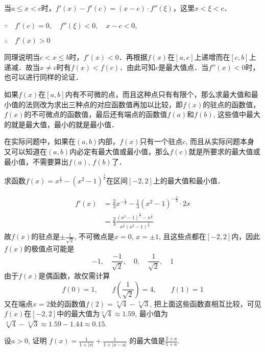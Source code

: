 当$a\le x<c$时，$f'(x)-f'(c)=(x-c)\cdot f''(\xi)$，这里$x<\xi<c$．

$\because\quad f' (c) =0,\quad f'' (\xi)<0,\quad x-c<0$,

$\therefore\quad f'(x)>0$

同理说明当$c<x\le b$时，$f'(x)<0$．再根据$f(x)$在$[a,c]$上递增而在$[c,b]$上递减．故当$x\ne c$时有$f(x)<f(c)$．由此可知$c$是最大值点．当$f''(x)<0$时，也可以进行同样的论证．

如果$f(x)$在$[a,b]$内有不可微的点，而且这种点只有有限个，那么求最大值和最小值的法则改为求出三种点的对应函数值再加以比较，即$f(x)$的驻点的函数值，$f(x)$的不可微点的函数值，最后还有端点的函数值$f(a)$和$f(b)$, 这些值中最大的就是最大值，最小的就是最小值．

在实际问题中，如果在$(a,b)$内部，$f(x)$只有一个驻点$c$, 而且从实际问题本身又可以知道在$(a,b)$内必定有最大值或最小值，那么$f(c)$就是所要求的最大值或最小值，不需要算出$f(a)$, $f(b)$了．

\begin{example}
求函数$f(x)=x^{\tfrac{2}{3}}-(x^2-1)^{\tfrac{1}{3}}$在区间$[-2,2]$上的最大值和最小值．
\end{example}


\begin{solution}
\begin{align*}
f'(x)&=\frac{2}{3}x^{-\tfrac{1}{3}}-\frac{1}{3}(x^2-1)^{-\tfrac{2}{3}}\cdot 2x\\
&=\frac{2}{3} \frac{(x^2-1)^{\tfrac{2}{3}}-x^{\tfrac{4}{3}}}{x^{\tfrac{1}{3}}(x^2-1)^{\tfrac{2}{3}}}    
\end{align*}
    故$f(x)$的驻点是$\pm\frac{1}{\sqrt{2}}$, 不可微点是$x=0$, $x=\pm 1$, 且这些点都在$[-2, 2]$内，因此$f(x)$的极值点可能是
\[-1,\quad \frac{-1}{\sqrt{2}},\quad  0,\quad \frac{1}{\sqrt{2}},\quad  1\]
    由于$f(x)$是偶函数，故仅需计算
\[    f (0) =1,\qquad f\left(\frac{1}{\sqrt{2}}\right) =4,\qquad f (1) =1\]
    又在端点$x=2$处的函数值$f(2)=\sqrt[3]{4}-\sqrt[3]{3}$, 把上面这些函数直相互比较，可见$f(x)$在$[-2, 2]$中的最大值为$\sqrt[3]{4}\approx 1.59$, 最小值为$\sqrt[3]{4}-\sqrt[3]{3}\approx 1.59-1. 44\approx 0.15$.
\end{solution}

\begin{example}
    设$a>0$, 证明
$    f (x) =\frac{1}{1+|x|}+\frac{1}{1+|x-a|}$
    的最大值是$\frac{2+a}{1+a}$.
\end{example}    

